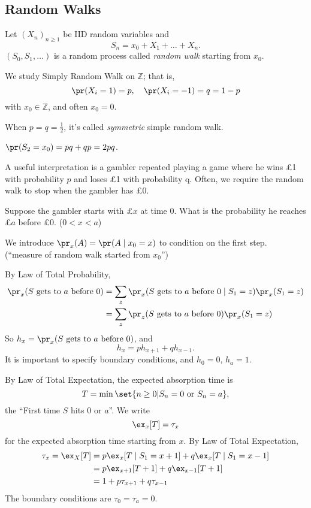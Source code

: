 \subsection{Random Walks}
\begin{definition}{}{}
    Let \((X_n)_{n \geq 1}\) be IID random variables and
    \[
        S_n = x_0 + X_1 + \dots + X_n.
    \]
    \((S_0, S_1, \dots)\) is a random process called \textit{random walk} starting from \(x_0\).
\end{definition}
\begin{example}
    We study Simply Random Walk on \(\mathbb{Z}\); that is,
    \[
        \pr(X_i = 1) = p, \quad \pr(X_i = -1) = q = 1 - p
    \]
    with \(x_0 \in \mathbb{Z}\), and often \(x_0 = 0\).

    When \(p = q = \frac{1}{2}\), it's called \textit{symmetric} simple random walk.
\end{example}
\begin{example}
    \(\pr(S_2 = x_0) = pq + qp = 2pq\).
\end{example}
A useful interpretation is a gambler repeated playing a game where he wins £1 with probability \(p\) and loses £1 with probability q. Often, we require the random walk to stop when the gambler has £0.
\begin{problem}
    Suppose the gambler starts with £\(x\) at time 0. What is the probability he reaches £\(a\) before £0. (\(0 < x < a\))
\end{problem}
\begin{notation}
    We introduce \(\pr_x(A) = \pr(A \mid x_0 = x)\) to condition on the first step. (``measure of random walk started from \(x_0\)'')
\end{notation}
By Law of Total Probability,
\begin{align*}
    \pr_x(S \text{ gets to }a\text{ before }0) &= \sum_z \pr_x(S \text{ gets to }a\text{ before }0 \mid S_1 = z)\pr_x(S_1 = z)\\
    &= \sum_z \pr_z(S \text{ gets to }a\text{ before } 0) \pr_x(S_1 = z)
\end{align*}
So \(h_x =\pr_x(S \text{ gets to }a\text{ before } 0)\), and
\[
    h_x = p h_{x + 1} + q h_{x - 1}.
\]
It is important to specify boundary conditions, and \(h_0 = 0\), \(h_a = 1\).

By Law of Total Expectation, the expected absorption time is
\[
    T = \min\set{n\geq 0| S_n=0 \text{ or } S_n = a},
\]
the ``First time \(S\) hits \(0\) or \(a\)''. We write
\[
    \ex_x[T] = \tau_x
\]
for the expected absorption time starting from \(x\). By Law of Total Expectation,
\begin{align*}
    \tau_x = \ex_X[T]&=p\ex_x[T \mid S_1 = x + 1] + q \ex_x[T \mid S_1=x-1]\\
    &= p \ex_{x+1}[T + 1] + q\ex_{x-1}[T+1]\\
    &= 1 + p\tau_{x+1} + q \tau_{x-1}
\end{align*}
The boundary conditions are \(\tau_0 = \tau_a = 0\).

